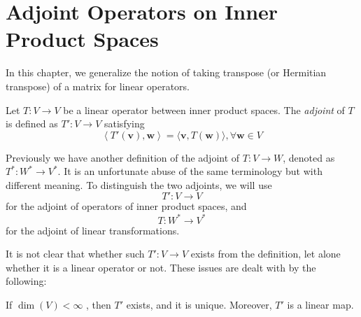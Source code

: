 \chapter{Adjoint Operators on Inner Product Spaces}

In this chapter, we generalize the notion of taking transpose (or Hermitian transpose) of a matrix for linear operators. 


\begin{definition} Let \(T : V \rightarrow  V\) be a linear operator between inner product spaces. The \emph{adjoint} of \(T\) is defined as \(T' : V \rightarrow  V\) satisfying
\[
\left\langle  {T'\left( \mathbf{v}\right) ,\mathbf{w}}\right\rangle   = \langle \mathbf{v},T\left( \mathbf{w}\right) \rangle ,\forall \mathbf{w} \in  V \tag{10.1}
\]
\end{definition}

\begin{remark}
Previously we have another definition of the adjoint of \(T : V \rightarrow  W\), denoted as \({T}^{ * } : {W}^{ * } \rightarrow {V}^{ * }\). 
    It is an unfortunate abuse of the same terminology but with different meaning. To distinguish the two adjoints, we will use
    $$T':V \to V$$
    for the adjoint of operators of inner product spaces, and 
    $$T: W^* \to V^*$$
    for the adjoint of linear transformations.
\end{remark}

It is not clear that whether such $T':V \to V$ exists from the definition, let alone whether it is a linear operator or not. These issues are dealt with by the following:
\begin{proposition} If \(\dim \left( V\right)  < \infty\) , then \(T'\) exists, and it is unique. Moreover, \(T'\) is a linear map.
\end{proposition}

